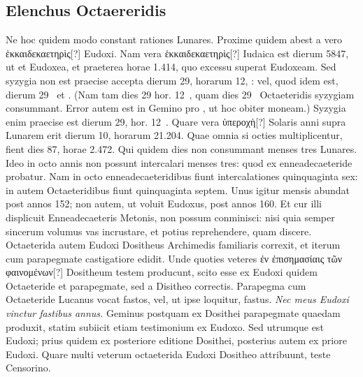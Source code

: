 \subsection{Elenchus Octaereridis}

Ne hoc quidem modo constant rationes Lunares.
Proxime
quidem abest a vero \textgreek{ἑκκαιδεκαετηρὶς[?]} Eudoxi.
Nam vera \textgreek{ἑκκαιδεκαετηρὶς[?]}
Iudaica est dierum 5847, ut et Eudoxea, et praeterea
horae 1.414, quo excessu superat Eudoxeam.
Sed syzygia non est praecise
accepta dierum 29, horarum 12, : vel, quod idem est,
 dierum 29~
et .
(Nam tam dies 29 hor. 12~, quam dies 29~
 Octaeteridis syzygiam
consummant. Error autem est in Gemino
 pro
 ,
  ut hoc obiter
moneam.)
Syzygia enim praecise est dierum 29, hor. 12~.
Quare
vera \textgreek{ὑπεροχὴ[?]} Solaris anni supra Lunarem erit
 dierum 10, horarum 21.204.
Quae omnia si octies multiplicentur, fient dies 87, horae 2.472.
Qui quidem dies non consummant menses tres Lunares.
Ideo in octo
annis non possunt intercalari menses tres: quod ex enneadecaeteride
probatur.
Nam in octo enneadecaeteridibus fiunt intercalationes
quinquaginta sex: in  autem Octaeteridibus fiunt quinquaginta
septem.
Unus igitur mensis abundat post annos 152; non autem, ut
voluit Eudoxus, post annos 160.
Et cur illi displicuit Enneadecaeteris
Metonis, non possum conminisci: nisi quia semper sincerum volumus
vas incrustare, et potius reprehendere, quam discere.
Octaeterida autem
Eudoxi Dositheus Archimedis familiaris correxit, et iterum cum
parapegmate castigatiore edidit.
Unde quoties veteres \textgreek{ἐν ἐπισημασίαις τῶν φαινομένων[?]}
Dositheum testem producunt, scito esse ex Eudoxi
quidem Octaeteride et parapegmate, sed a Disitheo correctis.
Parapegma
cum Octaeteride Lucanus vocat fastos, vel, ut ipse loquitur, fastus.
\emph{Nec meus Eudoxi vinctur fastibus annus.}
Geminus postquam ex
Dosithei parapegmate quaedam produxit, statim subiicit etiam testimonium
ex Eudoxo.
Sed utrumque est Eudoxi; prius quidem ex posteriore
editione Dosithei, posterius autem ex priore Eudoxi.
Quare
multi veterum octaeterida Eudoxi Dositheo attribuunt, teste Censorino.

